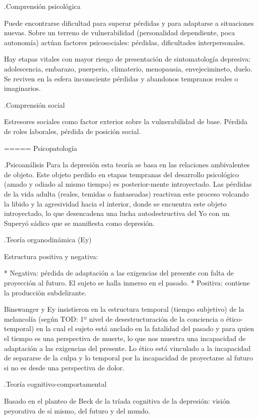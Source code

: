 .Comprensión psicológica

Puede encontrarse dificultad para superar pérdidas y para adaptarse a situaciones nuevas. Sobre un terreno de vulnerabilidad (personalidad dependiente, poca autonomía) actúan factores psicosociales: pérdidas, dificultades interpersonales.

Hay etapas vitales con mayor riesgo de presentación de sintomatología depresiva: adolescencia, embarazo, puerperio, climaterio, menopausia, envejecimineto, duelo. Se reviven en la esfera inconsciente pérdidas y abandonos tempranos reales o imaginarios.

.Comprensión social

Estresores sociales como factor exterior sobre la vulnerabilidad de base. Pérdida de roles laborales, pérdida de posición social.

===== Psicopatología

.Psicoanálisis
Para la depresión esta teoría se basa en las relaciones ambivalentes de objeto. Este objeto perdido en etapas tempranas del desarrollo psicológico (amado y odiado al mismo tiempo) es posterior-mente introyectado. Las pérdidas de la vida adulta (reales, temidas o fantaseadas) reactivan este proceso volcando la libido y la agresividad hacia el interior, donde se encuentra este objeto introyectado, lo que desencadena una lucha autodestructiva del Yo con un Superyó sádico que se manifiesta como depresión.

.Teoría organodinámica (Ey)

Estructura positiva y negativa:

* Negativa: pérdida de adaptación a las exigencias del presente con falta de proyección al futuro. El sujeto se halla inmerso en el pasado.
* Positiva: contiene la producción subdelirante.

Binswanger y Ey insistieron en la estructura temporal (tiempo subjetivo) de la melancolía (según TOD: 1º nivel de desestructuración de la conciencia o ético-temporal) en la cual el sujeto está anclado en la fatalidad del pasado y para quien el tiempo es una perspectiva de muerte, lo que nos muestra una incapacidad de adaptación a las exigencias del presente. Lo ético está vinculado a la incapacidad de separarse de la culpa y lo temporal por la incapacidad de proyectarse al futuro si no es desde una perspectiva de dolor.

.Teoría cognitivo-comportamental

Basado en el planteo de Beck de la tríada cognitiva de la depresión: visión peyorativa de sí mismo, del futuro y del mundo.

